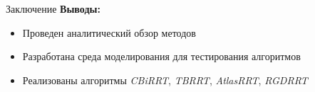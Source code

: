 \documentclass[11pt, aspectratio=169]{beamer}
\begin{document}

\begin{frame}{Заключение}
    \textbf{Выводы:}
    \begin{itemize}
        \item Проведен аналитический обзор методов
        \item Разработана среда моделирования для тестирования алгоритмов
        \item Реализованы алгоритмы \textit{CBiRRT}, \textit{TBRRT}, \textit{AtlasRRT}, \textit{RGDRRT}
    \end{itemize}
\end{frame}
\end{document}
